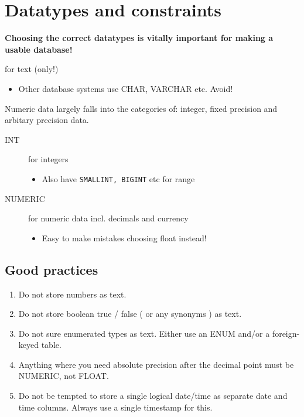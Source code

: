 \documentclass[slides]{pgnotes}
\begin{document}
\section{Datatypes and constraints} 

\textbf{Choosing the correct datatypes is vitally important for making a usable database!}

\begin{description}
\item[TEXT] for text (only!)
  \begin{itemize}
  \item Other database systems use CHAR, VARCHAR etc. Avoid!
  \end{itemize}
\item Numeric data largely falls into the categories of: integer, fixed precision and arbitary precision data.
  \begin{description}
  \item[INT] for integers
    \begin{itemize}
    \item Also have \texttt{SMALLINT, BIGINT} etc for range
    \end{itemize}
  \item[NUMERIC] for numeric data incl. decimals and currency
    \begin{itemize}
    \item Easy to make mistakes choosing float instead!
    \end{itemize}
  \end{description}
\end{description}

\subsection{Good practices}

\begin{enumerate}
  
\item Do not store numbers as text.

\item Do not store boolean true / false ( or any synonyms ) as text.

\item Do not sure enumerated types as text. Either use an ENUM and/or a foreign-keyed table.

\item Anything where you need absolute precision after the decimal point must be NUMERIC, not FLOAT. 
  
\item Do not be tempted to store a single logical date/time as separate date and time columns.
  Always use a single timestamp for this. 
  
\end{enumerate}
\end{document}
